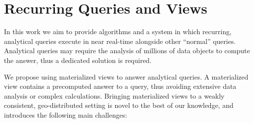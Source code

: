 \section{Recurring Queries and Views}
\label{sec:views_research_statement}

In this work we aim to provide algorithms and a system in which recurring, analytical queries execute in near real-time alongside other ``normal'' queries.
Analytical queries may require the analysis of millions of data objects to compute the answer, thus a dedicated solution is required.


We propose using materialized views to answer analytical queries.
A materialized view contains a precomputed answer to a query, thus avoiding extensive data analysis or complex calculations. 
Bringing materialized views to a weakly consistent, geo-distributed setting is novel to the best of our knowledge, and introduces the following main challenges:

